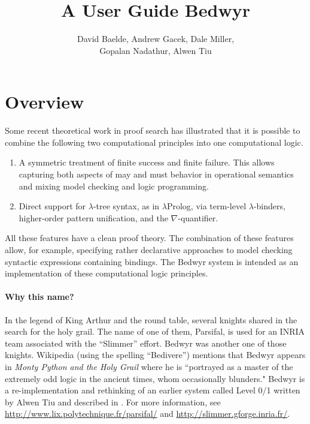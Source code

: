 \documentclass{article}
\title{{\Huge A User Guide Bedwyr}
}
\author{David Baelde, Andrew Gacek, Dale Miller, \\
        Gopalan Nadathur, Alwen Tiu}
\begin{document}
\maketitle
\tableofcontents
\newpage

\section{Overview}

Some recent theoretical work in proof search has illustrated that it
is possible to combine the following two computational principles into
one computational logic.
\begin{enumerate}
\item A symmetric treatment of finite success and finite failure.
  This allows capturing both aspects of may and must behavior in
  operational semantics and mixing model checking and logic programming.

\item Direct support for $\lambda$-tree syntax, as in $\lambda$Prolog,
       via term-level $\lambda$-binders, higher-order pattern
       unification, and the $\nabla$-quantifier.
\end{enumerate}
All these features have a clean proof theory.  The combination of
these features allow, for example, specifying rather declarative
approaches to model checking syntactic expressions containing
bindings.  The Bedwyr system is intended as an implementation of these
computational logic principles.


\paragraph{Why this name?}
In the legend of King Arthur and the round table, several knights
shared in the search for the holy grail.  The name of one of them,
Parsifal, is used for an INRIA team associated with the ``Slimmer''
effort.  Bedwyr was another one of those knights.  Wikipedia (using
the spelling ``Bedivere'') mentions that Bedwyr appears in {\em Monty
Python and the Holy Grail} where he is ``portrayed as a master of the
extremely odd logic in the ancient times, whom occasionally blunders."
Bedwyr is a re-implementation and rethinking of an earlier system
called Level 0/1 written by Alwen Tiu and described in
\cite{tiu05eshol}.  For more information, see
\url{http://www.lix.polytechnique.fr/parsifal/} and
\url{http://slimmer.gforge.inria.fr/}.
\end{document}
